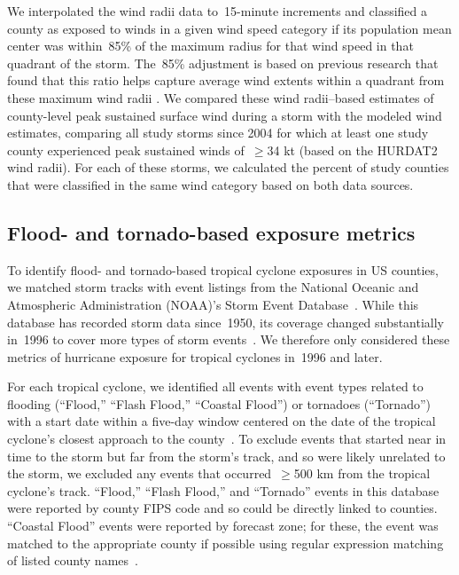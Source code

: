 We interpolated the wind radii data to~15-minute increments and
classified a county as exposed to winds in a given wind speed category if its
population mean center was within~85\% of the maximum radius for that wind
speed in that quadrant of the storm. The~85\% adjustment is based on previous
research that found that this ratio helps capture average wind extents within a
quadrant from these maximum wind radii \parencite{knaff2016using}.  We compared
these wind radii--based estimates of county-level peak sustained surface wind
during a storm with the modeled wind estimates, comparing all study storms
since 2004 for which at least one study county experienced peak sustained winds
of~$\ge$34 kt (based on the \ac{HURDAT2} wind radii). For each of these storms,
we calculated the percent of study counties that were classified in the same
wind category based on both data sources.

\subsection*{Flood- and tornado-based exposure metrics}

To identify flood- and tornado-based tropical cyclone exposures in \ac{US}
counties, we matched storm tracks with event listings from the National Oceanic
and Atmospheric Administration (NOAA)'s Storm Event
Database~\parencite{stormevents}. While this database has recorded storm data
since~1950, its coverage changed substantially in~1996 to cover more types of
storm events~\parencite{stormevents}. We therefore only considered these
metrics of hurricane exposure for tropical cyclones in~1996 and later.

For each tropical cyclone, we identified all events with event types related to
flooding (``Flood,'' ``Flash Flood,'' ``Coastal Flood'') or tornadoes
(``Tornado'') with a start date within a five-day window centered on the date
of the tropical cyclone's closest approach to the
county~\parencite{hurricaneexposuredata}. To exclude events that started near
in time to the storm but far from the storm's track, and so were likely
unrelated to the storm, we excluded any events that occurred~$\ge$500
\si{\kilo\metre} from the tropical cyclone's track. ``Flood,'' ``Flash Flood,''
and ``Tornado'' events in this database were reported by county \ac{FIPS} code
and so could be directly linked to counties.  ``Coastal Flood'' events were
reported by forecast zone; for these, the event was matched to the appropriate
county if possible using regular expression matching of listed county
names~\parencite{noaastormevents}. 

